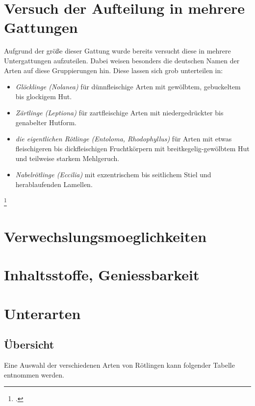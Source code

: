 \documentclass[a4paper,abstracton]{scrreprt}
\begin{document}
\section{Versuch der Aufteilung in mehrere Gattungen}
Aufgrund der größe dieser Gattung wurde bereits versucht diese in mehrere Untergattungen aufzuteilen. Dabei weisen besonders die deutschen Namen der Arten auf diese Gruppierungen hin. Diese lassen sich grob unterteilen in:
\begin{itemize}
\item \emph{Glöcklinge (Nolanea)} für dünnfleischige Arten mit gewölbtem, gebuckeltem bis glockigem Hut.
\item \emph{Zärtlinge (Leptiona)} für zartfleischige Arten mit niedergedrückter bis genabelter Hutform.
\item \emph{die eigentlichen Rötlinge (Entoloma, Rhodophyllus)} für Arten mit etwas fleischigeren bis dickfleischigen Fruchtkörpern mit breitkegelig-gewölbtem Hut und teilweise starkem Mehlgeruch.
\item \emph{Nabelrötlinge (Eccilia)} mit exzentrischem bis seitlichem Stiel und herablaufenden Lamellen.
\end{itemize}
\footcite{beschreibung}

\section{Verwechslungsmoeglichkeiten}
\section{Inhaltsstoffe, Geniessbarkeit}
\section{Unterarten}
\subsection{Übersicht}
Eine Auswahl der verschiedenen Arten von Rötlingen kann folgender Tabelle entnommen werden.
\end{document}

